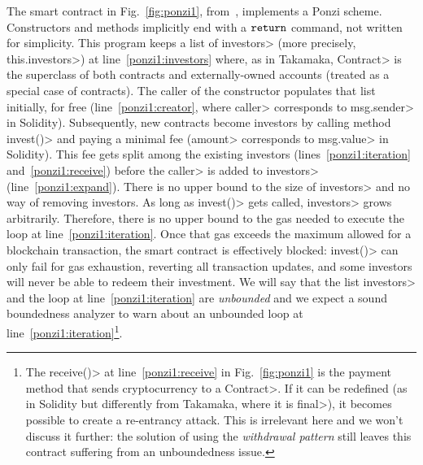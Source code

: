 The smart contract in Fig.~\ref{fig:ponzi1}, from~\cite{IyerD18}, implements a Ponzi scheme.
Constructors and methods implicitly end with a $\mathtt{return}$ command, not written for simplicity.
This program keeps a list of \<investors> (more precisely, \<this.investors>) at
line~\ref{ponzi1:investors} where, as in Takamaka, \<Contract> is the superclass of both
contracts and externally-owned accounts (treated as a special case of contracts).
The caller of the constructor populates that list initially, for free
(line~\ref{ponzi1:creator}, where \<caller> corresponds to
\<msg.sender> in Solidity). Subsequently, new contracts become investors
by calling method \<invest()> and paying a minimal fee (\<amount> corresponds to
\<msg.value> in Solidity). This fee gets split among the existing investors
(lines~\ref{ponzi1:iteration} and~\ref{ponzi1:receive}) before the \<caller> is
added to \<investors> (line~\ref{ponzi1:expand}). There is no upper bound
to the size of \<investors> and no way of removing investors.
As long as \<invest()> gets called,
\<investors> grows arbitrarily. Therefore, there is no upper bound
to the gas needed to execute the loop at line~\ref{ponzi1:iteration}. Once
that gas exceeds the maximum allowed for a blockchain transaction, the smart contract is
effectively blocked: \<invest()> can only fail for gas exhaustion, reverting
all transaction updates, and some investors will never be able to redeem their investment.
We will say that the list \<investors> and the loop at line~\ref{ponzi1:iteration}
are \emph{unbounded} and we expect a sound boundedness analyzer to warn about an
unbounded loop at line~\ref{ponzi1:iteration}\footnote{The \<receive()> at
line~\ref{ponzi1:receive} in Fig.~\ref{fig:ponzi1} is the payment
method that sends cryptocurrency to a \<Contract>. If it can be redefined
(as in Solidity but differently from Takamaka, where it is \<final>), it becomes
possible to create a re-entrancy attack. This is irrelevant here and
we won't discuss it further: the solution of using the \emph{withdrawal pattern}
still leaves this contract suffering from an unboundedness issue.}.
%
